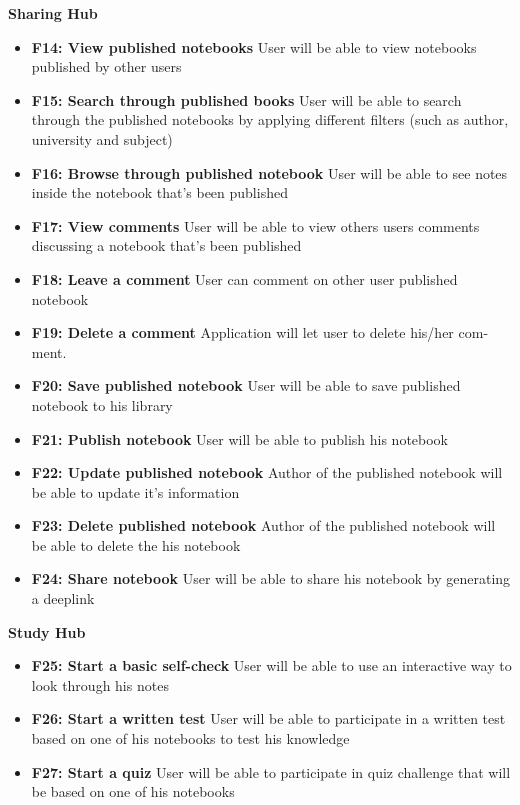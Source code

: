 \documentclass[thesis=B,english]{FITthesis}[2012/10/20]
\begin{document}
\bigskip
\textbf{Sharing Hub}
\begin{itemize}
	\item \textbf{F14: View published notebooks} User will be able to view notebooks published by other users
	\item \textbf{F15: Search through published books} User will be able to search through the published notebooks by applying different filters (such as author, university and subject)
	\item \textbf{F16: Browse through published notebook} User will be able to see notes inside the notebook that's been published
	\item \textbf{F17: View comments} User will be able to view others users comments discussing a notebook that's been published
	\item \textbf{F18: Leave a comment} User can comment on other user published notebook
	\item \textbf{F19: Delete a comment} Application will let user to delete his/her com- ment.
	\item \textbf{F20: Save published notebook} User will be able to save published notebook to his library
	\item \textbf{F21: Publish notebook} User will be able to publish his notebook
	\item \textbf{F22: Update published notebook} Author of the published notebook will be able to update it's information
	\item \textbf{F23: Delete published notebook} Author of the published notebook will be able to delete the his notebook
	\item \textbf{F24: Share notebook} User will be able to share his notebook by generating a deeplink
 \end{itemize}

\bigskip
\textbf{Study Hub}
\begin{itemize}
	\item \textbf{F25: Start a basic self-check} User will be able to use an interactive way to look through his notes
	\item \textbf{F26: Start a written test} User will be able to participate in a written test based on one of his notebooks to test his knowledge
	\item \textbf{F27: Start a quiz} User will be able to participate in quiz challenge that will be based on one of his notebooks
	
\end{itemize}
\end{document}
